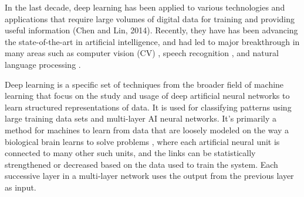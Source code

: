 In the last decade, deep learning has been applied to various technologies and applications \cite{dl_evolution} that require large volumes of digital data for training and providing useful information (Chen and Lin, 2014). Recently, they have has been advancing the state-of-the-art in artificial intelligence, and had led to major breakthrough in many areas such as computer vision (CV) \cite{krizhevsky2012imagenet} \cite{karpathy2014large}, speech recognition \cite{graves2013speech} \cite{mohamed2012acoustic}, and natural language processing \cite{bengio2003neural} \cite{mikolov2013distributed} \cite{mikolov2010recurrent}.

Deep learning \cite{Polson2018} is a specific set of techniques from the broader field of machine learning that focus on the study and usage of deep artificial neural networks to learn structured representations of data. It is used for classifying patterns using large training data sets and multi-layer AI neural networks. It's primarily a method for machines to learn from data that are loosely modeled on the way a biological brain learns to solve problems \cite{pavlus_john}, where each artificial neural unit is connected to many other such units, and the links can be statistically strengthened or decreased based on the data used to train the system. Each successive layer in a multi-layer network uses the output from the previous layer as input.

